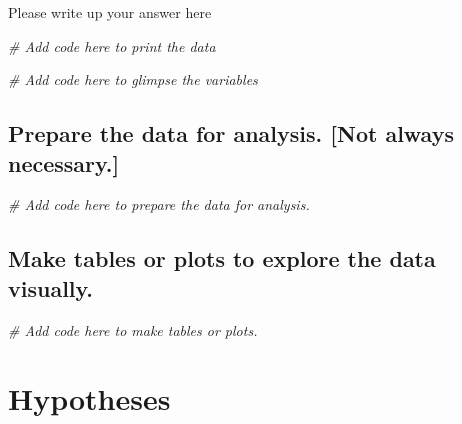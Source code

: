 \documentclass[
]{book}
\newenvironment{Shaded}{\begin{snugshade}}{\end{snugshade}}
\newcommand{\CommentTok}[1]{\textcolor[rgb]{0.56,0.35,0.01}{\textit{#1}}}
\begin{document}
Please write up your answer here

\begin{Shaded}
\begin{Highlighting}[]
\CommentTok{\# Add code here to print the data}
\end{Highlighting}
\end{Shaded}

\begin{Shaded}
\begin{Highlighting}[]
\CommentTok{\# Add code here to glimpse the variables}
\end{Highlighting}
\end{Shaded}

\hypertarget{prepare-the-data-for-analysis.-not-always-necessary.-2}{%
\subsection*{Prepare the data for analysis. {[}Not always necessary.{]}}\label{prepare-the-data-for-analysis.-not-always-necessary.-2}}

\begin{Shaded}
\begin{Highlighting}[]
\CommentTok{\# Add code here to prepare the data for analysis.}
\end{Highlighting}
\end{Shaded}

\hypertarget{make-tables-or-plots-to-explore-the-data-visually.-2}{%
\subsection*{Make tables or plots to explore the data visually.}\label{make-tables-or-plots-to-explore-the-data-visually.-2}}

\begin{Shaded}
\begin{Highlighting}[]
\CommentTok{\# Add code here to make tables or plots.}
\end{Highlighting}
\end{Shaded}

\hypertarget{hypotheses-2}{%
\section*{Hypotheses}\label{hypotheses-2}}
\end{document}
